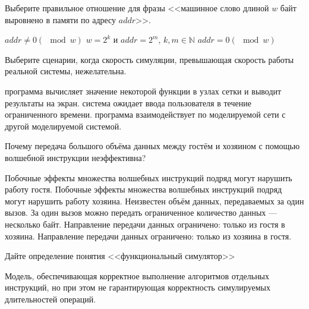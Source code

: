 \documentclass[a4paper, addpoints]{exam}
\begin{document}
\begin{questions}
\question[1] Выберите правильное отношение для фразы <<машинное слово длиной $w$ байт выровнено в памяти по адресу $addr$>>.
\begin{choices}
	\choice $addr \neq 0 (\mod w)$
	\choice $w = 2^k$ и $addr = 2^m$, $k,m \in \mathbb{N}$
    \correctchoice $addr = 0 (\mod w)$
\end{choices}

\question[1] Выберите сценарии, когда скорость симуляции, превышающая скорость работы реальной системы, нежелательна.
\begin{choices}
    \choice программа вычисляет значение некоторой функции в узлах сетки и выводит результаты на экран.
    \correctchoice система ожидает ввода пользователя в течение ограниченного времени.
    \choice программа взаимодействует по моделируемой сети с другой моделируемой системой.
\end{choices}



\question[1] Почему передача большого объёма данных между гостём и хозяином с помощью волшебной инструкции неэффективна?
\begin{choices}
	\choice Побочные эффекты множества волшебных инструкций подряд могут нарушить работу гостя.
	\choice Побочные эффекты множества волшебных инструкций подряд могут нарушить работу хозяина.
	\choice Неизвестен объём данных, передаваемых за один вызов.
	\correctchoice За один вызов можно передать ограниченное количество данных --- несколько байт.
	\choice Направление передачи данных ограничено: только из гостя в хозяина.
	\choice Направление передачи данных ограничено: только из хозяина в гостя.
\end{choices}



\question[3] Дайте определение понятия <<функциональный симулятор>>
\begin{solution}[2cm]
Модель, обеспечивающая корректное выполнение алгоритмов отдельных инструкций, но при этом не гарантирующая корректность симулируемых длительностей операций.
\end{solution}
    

\end{questions}
\end{document}
